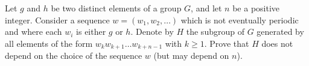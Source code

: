 \documentclass{article}
\begin{document}
\setlength{\parindent}{0pt}
Let $g$ and $h$ be two distinct elements of a group $G$, and let $n$ be a positive integer. Consider a sequence $w=(w_1,w_2,\ldots)$ which is not eventually periodic and where each $w_i$ is either $g$ or $h$. Denote by $H$ the subgroup of $G$ generated by all elements of the form $w_{k}w_{k+1}\ldots w_{k+n-1}$ with $k\geq 1$. Prove that $H$ does not depend on the choice of the sequence $w$ (but may depend on $n$).
\end{document}
